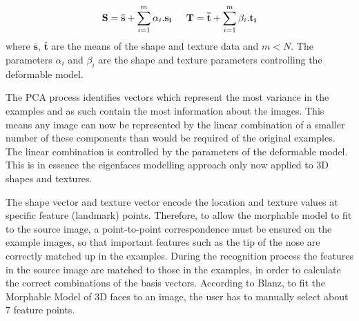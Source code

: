 \documentclass[11pt,a4paper]{report}
\begin{document}
\begin{equation}\label{eq:morhpable_pca}
\mathbf{S} = \mathbf{\bar{s}} + \sum_{i=1}^m\alpha_i.\mathbf{s_i} \indent \mathbf{T} = \mathbf{\bar{t}} + \sum_{i=1}^m\beta_i.\mathbf{t_i}
\end{equation}
where $\mathbf{\bar{s}}$, $\mathbf{\bar{t}}$ are the means of the shape and
texture data and $m < N$. The parameters $\alpha_i$ and $\beta_i$ are the
shape and texture parameters controlling the deformable model.

The PCA process identifies vectors which represent the most variance in
the examples and as such contain the most information about
the images. This means any image can now be represented by the linear
combination of a smaller number of these components than would be
required of the original examples. The linear combination is controlled by the
parameters of the deformable model. This is in essence the eigenfaces modelling approach
only now applied to 3D shapes and textures.

The shape vector and texture vector encode the location and texture values at
specific feature (landmark) points. Therefore, to allow the morphable model to fit to the source image, a
point-to-point correspondence must be ensured on the example
images, so that important features such as the tip of the nose are
correctly matched up in the examples. During the recognition process the features in the source image are matched to those in the examples, in order to
calculate the correct combinations of the basis vectors. According to Blanz, to fit the Morphable Model of 3D faces to an image, the user has to manually select
about 7 feature points. 
\end{document}
